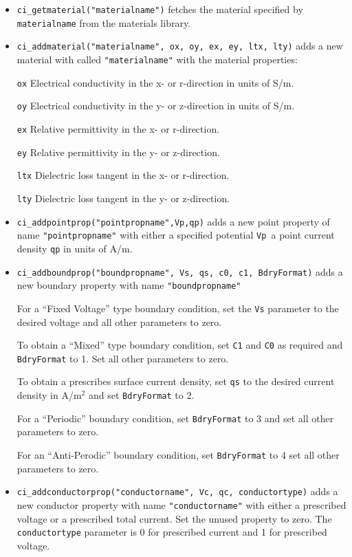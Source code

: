\begin{itemize}
\item \texttt{ci\_getmaterial("materialname")} fetches the material specified by \texttt{materialname} 
from the materials library.

\item \texttt{ci\_addmaterial("materialname", ox, oy, ex, ey, ltx, lty)} adds a new material with
called \texttt{"materialname"} with the material properties:

\texttt{ox} Electrical conductivity in the x- or r-direction in units of S/m.

\texttt{oy} Electrical conductivity in the y- or z-direction in units of S/m.

\texttt{ex} Relative permittivity in the x- or r-direction.

\texttt{ey} Relative permittivity in the y- or z-direction.

\texttt{ltx} Dielectric loss tangent in the x- or r-direction.

\texttt{lty} Dielectric loss tangent in the y- or z-direction.

\item \texttt{ci\_addpointprop("pointpropname",Vp,qp)} adds a new point property of
name \texttt{"pointpropname"} with either a specified potential
\texttt{Vp }a point current density \texttt{qp} in units of A/m.

\item \texttt{ci\_addboundprop("boundpropname", Vs, qs, c0, c1, BdryFormat)} adds a
new boundary property with name \texttt{"boundpropname"}

For a ``Fixed Voltage'' type boundary condition, set the
\texttt{Vs} parameter to the desired voltage and all other
parameters to zero.

To obtain a ``Mixed'' type boundary condition, set \texttt{C1} and
\texttt{C0} as required and \texttt{BdryFormat} to 1. Set all other
parameters to zero.

To obtain a prescribes surface current density, set \texttt{qs} to
the desired current density in A/m$^{2}$ and set \texttt{BdryFormat}
to 2.

For a ``Periodic'' boundary condition, set \texttt{BdryFormat} to 3
and set all other parameters to zero.

For an ``Anti-Perodic'' boundary condition, set \texttt{BdryFormat}
to 4 set all other parameters to zero.

\item \texttt{ci\_addconductorprop("conductorname", Vc, qc, conductortype)} adds a new
conductor property with name \texttt{"conductorname"} with either a
prescribed voltage or a prescribed total current. Set the unused
property to zero. The \texttt{conductortype} parameter is 0 for
prescribed current and 1 for prescribed voltage.


\end{itemize}
